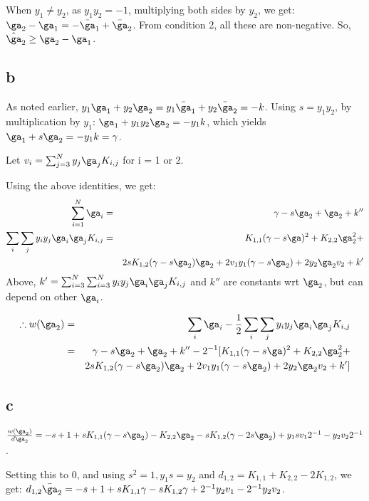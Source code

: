 \documentclass{article}
\begin{document}
When $y_{1} \neq y_{2}$, as $y_{1}y_{2} = -1$, multiplying both sides by $y_{2}$, we get: $\ga_{2} - \ga_{1} = -\bar{\ga}_{1} + \bar{\ga}_{2}$. From condition 2, all these are non-negative. So, $\hat{\ga}_{2} \geq \ga_{2} - \ga_{1}$.

\subsection{b}
As noted earlier, $y_{1}\ga_{1} +  y_{2}\ga_{2} = y_{1}\bar{\ga}_{1} +  y_{2}\bar{\ga}_{2} = -k$. Using $s = y_{1}y_{2}$, by multiplication by $y_{1}$: $\ga_{1} +  y_{1}y_{2}\ga_{2} = -y_{1}k$, which yields $\ga_{1} +  s\ga_{2} = -y_{1}k = \gamma$.

Let $v_{i} = \sum_{j=3}^{N}y_{j}\ga_{j}K_{i,j}$ for i = 1 or 2.

Using the above identities, we get:
\begin{eqnarray*}
\sum_{i=1}^{N} \ga_{i} &=& \gamma - s\ga_{2} + \ga_{2} + k'' \\
\sum_{i}\sum_{j} y_{i}y_{j} \ga_{i} \ga_{j}K_{i,j} &=& K_{1,1}(\gamma - s\ga)^{2} + K_{2,2}\ga_{2}^{2} + \\
&& 2sK_{1,2}(\gamma - s\ga_{2})\ga_{2} + 2v_{1}y_{1}(\gamma - s\ga_{2}) + 2y_{2}\ga_{2}v_{2} + k'\\
\end{eqnarray*}
Above, $k' = \sum_{i=3}^{N}\sum_{i=3}^{N}y_{i}y_{j} \ga_{i} \ga_{j}K_{i,j}$ and $k''$ are constants wrt $\ga_{2}$, but can depend on other $\ga_i$.

\begin{eqnarray*}
\therefore w(\ga_2) &=& \sum_{i} \ga_{i} - \frac{1}{2}\sum_{i}\sum_{j} y_{i}y_{j} \ga_{i} \ga_{j}K_{i,j}\\
&=& \gamma - s\ga_{2} + \ga_{2}  + k'' -2^{-1}[ K_{1,1}(\gamma - s\ga)^{2} + K_{2,2}\ga_{2}^{2} + \\
&& 2sK_{1,2}(\gamma - s\ga_{2})\ga_{2} + 2v_{1}y_{1}(\gamma - s\ga_{2}) + 2y_{2}\ga_{2}v_{2} + k']\\
\end{eqnarray*}


\subsection{c}
$\frac{w(\ga_{2})}{d\ga_{2}} = -s + 1 + sK_{1,1}(\gamma - s\ga_{2}) - K_{2,2}\ga_{2} - sK_{1,2}(\gamma - 2s\ga_{2}) + y_{1}sv_{1}2^{-1} - y_{2}v_{2}2^{-1}$.

Setting this to 0, and using $s^{2} = 1, y_{1}s = y_{2}$ and $d_{1,2} = K_{1,1} + K_{2,2} - 2K_{1,2}$, we get: $d_{1,2}\bar{\ga}_2 =  -s + 1 + sK_{1,1}\gamma - sK_{1,2}\gamma +2^{-1}y_{2}v_{1} - 2^{-1}y_{2}v_{2}$.
\end{document}
